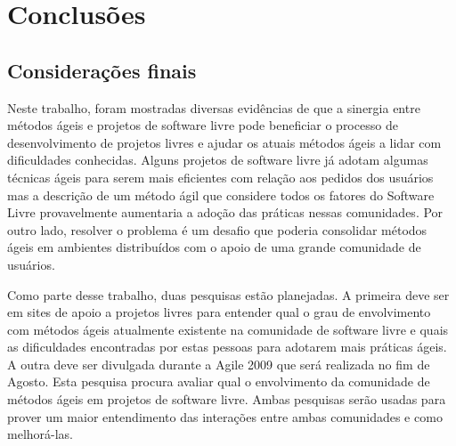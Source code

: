 \chapter{Conclusões}
\label{cap:conclusoes}


\section{Considerações finais}

Neste trabalho, foram mostradas diversas evidências de que a sinergia
entre métodos ágeis e projetos de software livre pode beneficiar o
processo de desenvolvimento de projetos livres e ajudar os atuais
métodos ágeis a lidar com dificuldades conhecidas. Alguns projetos de
software livre já adotam algumas técnicas ágeis para serem mais
eficientes com relação aos pedidos dos usuários mas a descrição de um
método ágil que considere todos os fatores do Software Livre
provavelmente aumentaria a adoção das práticas nessas comunidades. Por
outro lado, resolver o problema é um desafio que poderia consolidar
métodos ágeis em ambientes distribuídos com o apoio de uma grande
comunidade de usuários.

Como parte desse trabalho, duas pesquisas estão planejadas. A primeira
deve ser em sites de apoio a projetos livres para entender qual o grau
de envolvimento com métodos ágeis atualmente existente na comunidade
de software livre e quais as dificuldades encontradas por estas
pessoas para adotarem mais práticas ágeis. A outra deve ser divulgada
durante a Agile 2009 que será realizada no fim de Agosto. Esta
pesquisa procura avaliar qual o envolvimento da comunidade de métodos
ágeis em projetos de software livre. Ambas pesquisas serão usadas para
prover um maior entendimento das interações entre ambas comunidades e
como melhorá-las.


